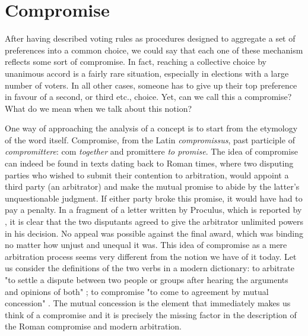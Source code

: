 
\section{Compromise}

After having described voting rules as procedures designed to aggregate a set of preferences into a common choice, we could say that each one of these mechanism reflects some sort of compromise. In fact, reaching a collective choice by unanimous accord is a fairly rare situation, especially in elections with a large number of voters. In all other cases, someone has to give up their top preference in favour of a second, or third etc., choice. Yet, can we call this a compromise? What do we mean when we talk about this notion?

One way of approaching the analysis of a concept is to start from the etymology of the word itself. Compromise, from the Latin \textit{compromissus}, past participle of \textit{compromittere}: com \textit{together} and promittere \textit{to promise}.
The idea of compromise can indeed be found in texts dating back to Roman times, where two disputing parties who wished to submit their contention to arbitration, would appoint a third party (an arbitrator) and make the mutual promise to abide by the latter's unquestionable judgment. If either party broke this promise, it would have had to pay a penalty.
In a fragment of a letter written by Proculus, which is reported by \citet[p.529]{Zimmermann1996}, it is clear that the two disputants agreed to give the arbitrator unlimited powers in his decision. No appeal was possible against the final award, which was binding no matter how unjust and unequal it was. This idea of compromise as a mere arbitration process seems very different from the notion we have of it today. Let us consider the definitions of the two verbs in a modern dictionary: to arbitrate "to settle a dispute between two people or groups after hearing the arguments and opinions of both" \citep{Arbitration}; to compromise "to come to agreement by mutual concession" \citep{Compromise}.
The mutual concession is the element that immediately makes us think of a compromise and it is precisely the missing factor in the description of the Roman compromise and modern arbitration.

